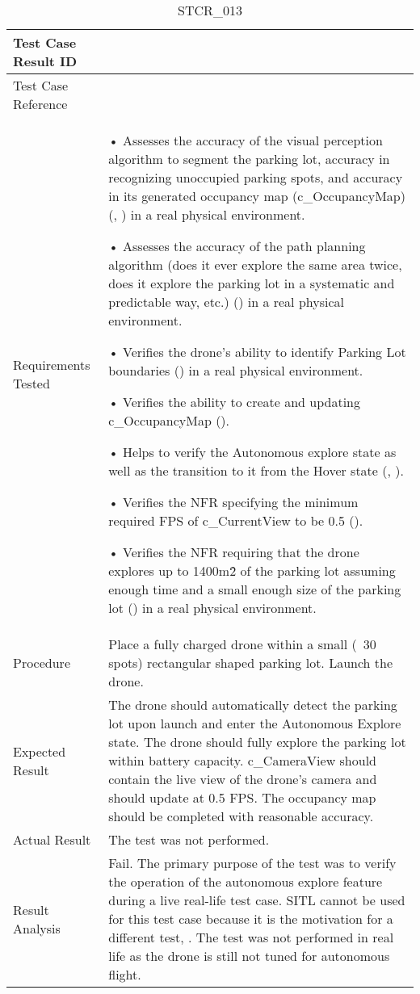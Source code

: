 \documentclass[12pt, titlepage]{article}
\begin{document}
\begin{table}[!h]
\begin{center}
\caption {STCR\_013}
\label{tab:STCR_013}
\begin{tabular}{ | m{3.2cm} | m{12.2cm} | } 
\hline
Test Case Result ID & \nameref{tab:STCR_013} \\ 
\hline
Test Case Reference & \nameref{tab:STC_013}  \\ 
\hline
Requirements Tested & \item • Assesses the accuracy of the visual perception algorithm to segment the parking lot, accuracy in recognizing unoccupied parking spots, and accuracy in its generated occupancy map (c\_OccupancyMap) (\nameref{GEN_005}, \nameref{GEN_006}) in a real physical environment.

• Assesses the accuracy of the path planning algorithm (does it ever explore the same area twice, does it explore the parking lot in a systematic and predictable way, etc.) (\nameref{STA_003}) in a real physical environment.

• Verifies the drone’s ability to identify Parking Lot boundaries (\nameref{GEN_001}) in a real physical environment.

• Verifies the ability to create and updating c_OccupancyMap (\nameref{GEN_002}).

• Helps to verify the Autonomous explore state as well as the transition to it from the Hover state (\nameref{STA_003}, \nameref{TRANS_004}).

• Verifies the NFR specifying the minimum required FPS of c\_CurrentView to be 0.5 (\nameref{PERF_004}).

• Verifies the NFR requiring that the drone explores up to 1400m\^2 of the parking lot assuming enough time and a small enough size of the parking lot (\nameref{PERF_001}) in a real physical environment.
\\ 
\hline
Procedure & Place a fully charged drone within a small (~30 spots) rectangular shaped parking lot.  Launch the drone. \\
\hline
Expected Result & The drone should automatically detect the parking lot upon launch and enter the Autonomous Explore state. The drone should fully explore the parking lot within battery capacity. c\_CameraView should contain the live view of the drone's camera and should update at 0.5 FPS. The occupancy map should be completed with reasonable accuracy.  \\ 
\hline
Actual Result &  The test was not performed. \\
\hline
Result Analysis & Fail. The primary purpose of the test was to verify the operation of the  autonomous explore feature during a live real-life test case. SITL cannot be used for this test case because it is the motivation for a different test, \nameref{tab:STC_016}. The test was not performed in real life as the drone is still not tuned for autonomous flight.  \\ 
\hline
\end{tabular}
\end{center}
\end{table}
\end{document}
